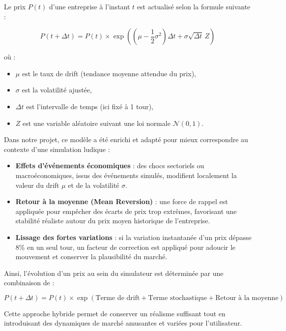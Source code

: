 Le prix $P(t)$ d'une entreprise à l'instant $t$ est actualisé selon la formule suivante :

\[
P(t+\Delta t) = P(t) \times \exp\left(\left(\mu - \frac{1}{2} \sigma^2\right) \Delta t + \sigma \sqrt{\Delta t} \, Z\right)
\]

où :
\begin{itemize}
    \item $\mu$ est le taux de drift (tendance moyenne attendue du prix),
    \item $\sigma$ est la volatilité ajustée,
    \item $\Delta t$ est l'intervalle de temps (ici fixé à 1 tour),
    \item $Z$ est une variable aléatoire suivant une loi normale $\mathcal{N}(0,1)$.
\end{itemize}

Dans notre projet, ce modèle a été enrichi et adapté pour mieux correspondre au contexte d'une simulation ludique :

\begin{itemize}
    \item \textbf{Effets d'événements économiques} : des chocs sectoriels ou macroéconomiques, issus des événements simulés, modifient localement la valeur du drift $\mu$ et de la volatilité $\sigma$.
    \item \textbf{Retour à la moyenne (Mean Reversion)} : une force de rappel est appliquée pour empêcher des écarts de prix trop extrêmes, favorisant une stabilité réaliste autour du prix moyen historique de l'entreprise.
    \item \textbf{Lissage des fortes variations} : si la variation instantanée d'un prix dépasse 8\% en un seul tour, un facteur de correction est appliqué pour adoucir le mouvement et conserver la plausibilité du marché.
\end{itemize}

Ainsi, l'évolution d'un prix au sein du simulateur est déterminée par une combinaison de :

\[
P(t+\Delta t) = P(t) \times \exp\left( \text{Terme de drift} + \text{Terme stochastique} + \text{Retour à la moyenne} \right)
\]

Cette approche hybride permet de conserver un réalisme suffisant tout en introduisant des dynamiques de marché amusantes et variées pour l'utilisateur.




